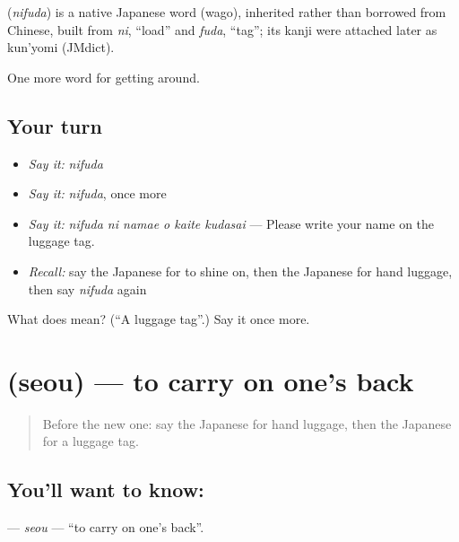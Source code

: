 \begin{cousinweb}
\textbf{} (\emph{nifuda}) is a native Japanese word (wago), inherited rather than borrowed from Chinese, built from \emph{ni}, \textquotedblleft{}load\textquotedblright{} and \emph{fuda}, \textquotedblleft{}tag\textquotedblright{}; its kanji were attached later as kun'yomi (JMdict).
\end{cousinweb}

\begin{grammarlens}[title={What you've built}]
One more word for getting around.
\end{grammarlens}

\subsection*{Your turn}
\begin{itemize}
\raggedright
  \item \emph{Say it:} \emph{nifuda}
  \item \emph{Say it:} \emph{nifuda}, once more
  \item \emph{Say it:} \emph{nifuda ni namae o kaite kudasai} — Please write your name on the luggage tag.
  \item \emph{Recall:} say the Japanese for to shine on, then the Japanese for hand luggage, then say \emph{nifuda} again
\end{itemize}

\begin{tcolorbox}[breakable,colback=teal!4,colframe=teal!35!black,title={Before you move on}]
What does  mean? (\textquotedblleft{}A luggage tag\textquotedblright{}.) Say it once more.
\end{tcolorbox}
\section[\texorpdfstring{\ja{せおう} (seou)}{せおう (seou)}]{ (seou) — to carry on one's back}

\label{lesson:JA-C417-seou}



\begin{quote}
Before the new one: say the Japanese for hand luggage, then the Japanese for a luggage tag.
\end{quote}

\subsection*{You'll want to know: }
\textbf{} — \emph{seou} — \textquotedblleft{}to carry on one's back\textquotedblright{}.

